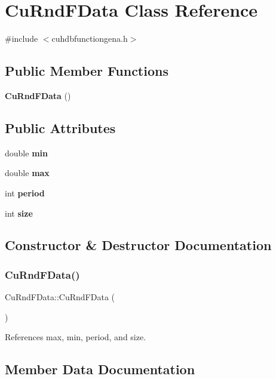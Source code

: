 \section{Cu\+Rnd\+F\+Data Class Reference}
\label{classCuRndFData}


{\ttfamily \#include $<$cuhdbfunctiongena.\+h$>$}

\subsection*{Public Member Functions}
\begin{DoxyCompactItemize}
\item 
\textbf{ Cu\+Rnd\+F\+Data} ()
\end{DoxyCompactItemize}
\subsection*{Public Attributes}
\begin{DoxyCompactItemize}
\item 
double \textbf{ min}
\item 
double \textbf{ max}
\item 
int \textbf{ period}
\item 
int \textbf{ size}
\end{DoxyCompactItemize}


\subsection{Constructor \& Destructor Documentation}
\mbox{\label{classCuRndFData_a5f232501682eb1b8c45941267b7761e2}} 
\subsubsection{CuRndFData()}
{\footnotesize\ttfamily Cu\+Rnd\+F\+Data\+::\+Cu\+Rnd\+F\+Data (\begin{DoxyParamCaption}{ }\end{DoxyParamCaption})\hspace{0.3cm}{\ttfamily [inline]}}



References max, min, period, and size.



\subsection{Member Data Documentation}
\mbox{\label{classCuRndFData_a0ff4e409f028cfc46b5ced7ee22e03ed}} 

